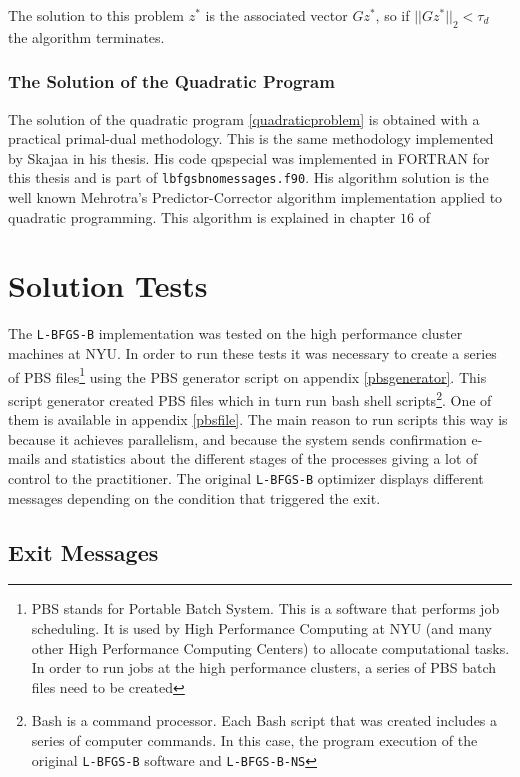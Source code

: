 The solution to this problem $z^*$ is the associated vector $Gz^*$, so if $||Gz^*||_2 < \tau_d$ the algorithm terminates.

\subsection{The Solution of the Quadratic Program}

The solution of the quadratic program \eqref{quadraticproblem} is obtained with a practical primal-dual methodology. This is the same methodology implemented by Skajaa \citep{skajaa} in his thesis. His code \textsf{qpspecial} was implemented in \textsc{FORTRAN} for this thesis and is part of \texttt{lbfgsbnomessages.f90}. His algorithm solution is the well known Mehrotra's Predictor-Corrector algorithm implementation applied to quadratic programming. This algorithm is explained in chapter $16$ of \citep{nocedal}

\chapter{Solution Tests}

The \texttt{L-BFGS-B} implementation was tested on the high performance cluster machines at NYU. In order to run these tests it was necessary to create a series of PBS files\footnote{PBS stands for Portable Batch System. This is a software that performs job scheduling. It is used by High Performance Computing at NYU (and many other High Performance Computing Centers) to allocate computational tasks. In order to run jobs at the high performance clusters, a series of PBS batch files need to be created} using the PBS generator script on appendix \eqref{pbsgenerator}. This script generator created PBS files which in turn run bash shell scripts\footnote{Bash is a command processor. Each Bash script that was created includes a series of computer commands. In this case, the program execution of the original \texttt{L-BFGS-B} software and \texttt{L-BFGS-B-NS}}. One of them is available in appendix \eqref{pbsfile}. The main reason to run scripts this way is because it achieves parallelism, and because the system sends confirmation e-mails and statistics about the different stages of the processes giving a lot of control to the practitioner. The original \texttt{L-BFGS-B} optimizer displays different messages depending on the condition that triggered the exit.  

\section{Exit Messages}

